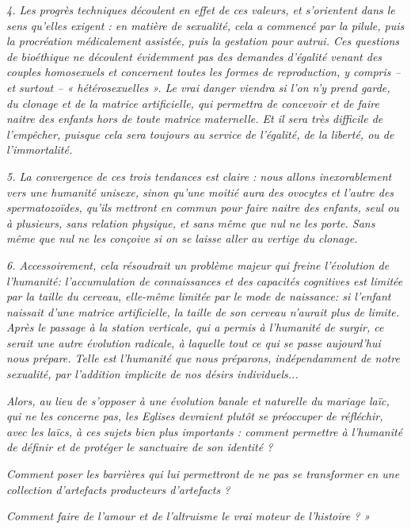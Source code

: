\begin{displayquote}
\emph{4. Les progrès techniques découlent en effet de ces valeurs, et s'orientent dans le sens qu'elles exigent : en matière de sexualité, cela a commencé par la pilule, puis la procréation médicalement assistée, puis la gestation pour autrui. Ces questions de bioéthique ne découlent évidemment pas des demandes d'égalité venant des couples homosexuels et concernent toutes les formes de reproduction, y compris -- et surtout -- « hétérosexuelles ». Le vrai danger viendra si l'on n'y prend garde, du clonage et de la matrice artificielle, qui permettra de concevoir et de faire naitre des enfants hors de toute matrice maternelle. Et il sera très difficile de l'empêcher, puisque cela sera toujours au service de l'égalité, de la liberté, ou de l'immortalité.}

\emph{5. La convergence de ces trois tendances est claire : nous allons inexorablement vers une humanité unisexe, sinon qu'une moitié aura des ovocytes et l'autre des spermatozoïdes, qu'ils mettront en commun pour faire naitre des enfants, seul ou à plusieurs, sans relation physique, et sans même que nul ne les porte. Sans même que nul ne les conçoive si on se laisse aller au vertige du clonage.}

\emph{6. Accessoirement, cela résoudrait un problème majeur qui freine l'évolution de l'humanité: l'accumulation de connaissances et des capacités cognitives est limitée par la taille du cerveau, elle-même limitée par le mode de naissance: si l'enfant naissait d'une matrice artificielle, la taille de son cerveau n'aurait plus de limite. Après le passage à la station verticale, qui a permis à l'humanité de surgir, ce serait une autre évolution radicale, à laquelle tout ce qui se passe aujourd'hui nous prépare. Telle est l'humanité que nous préparons, indépendamment de notre sexualité, par l'addition implicite de nos désirs individuels...}

\emph{Alors, au lieu de s'opposer à une évolution banale et naturelle du mariage laïc, qui ne les concerne pas, les Eglises devraient plutôt se préoccuper de réfléchir, avec les laïcs, à ces sujets bien plus importants : comment permettre à l'humanité de définir et de protéger le sanctuaire de son identité ?}

\emph{Comment poser les barrières qui lui permettront de ne pas se transformer en une collection d'artefacts producteurs d'artefacts ?}

\emph{Comment faire de l'amour et de l'altruisme le vrai moteur de l'histoire ? »}
\end{displayquote}

